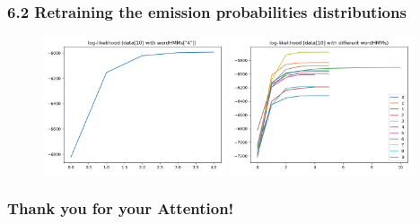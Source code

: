 \documentclass[t]{beamer}
\begin{document}
\begin{frame}
	\frametitle{6.2 Retraining the emission probabilities distributions}
	\begin{figure}
\centering
		\includegraphics[width=0.48\textwidth]{figures/621.png}
		\includegraphics[width=0.48\textwidth]{figures/622.png}
	\end{figure}

\end{frame}

\begin{frame}
	\frametitle{Thank you for your Attention!}	
\end{frame}
	
\end{document}
